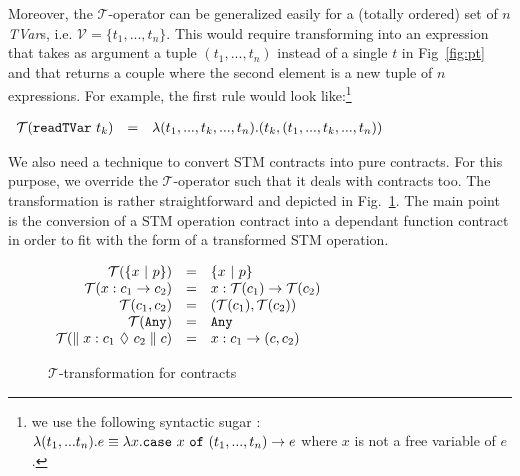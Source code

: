 \documentclass[submission,copyright,creativecommons]{eptcs}
\newcommand{\code}[1]{\textrm{{\tt #1}}}
\newcommand{\caseof}[2]{\code{case} \ #1 \ \code{of} \ #2 }
\newcommand{\readTVarONLY}{\ensuremath{\code{readTVar}}}
\newcommand{\readTVar}[1]{\ensuremath{\readTVarONLY \ #1}}
\newcommand{\pt}{\ensuremath{\mathcal{T}}}
\begin{document}
Moreover, the $\pt$-operator can be generalized easily for a (totally ordered) set of $n$ \emph{TVar}s, i.e. $\mathcal{V} = \{ t_1,...,t_n \}$. This would require transforming into an expression that takes as argument a tuple $(t_1,...,t_n)$ instead of a single $t$ in Fig~\ref{fig:pt} and that returns a couple where the second element is a new tuple of $n$ expressions. For example, the first rule would look like:\footnote{we use the following syntactic sugar : $ \lambda (t_1,...t_n) . e \equiv \lambda x . \caseof{x}{(t_1,...,t_n) -> e}$ where $x$ is not a free variable of $e$.}
\begin{center}
  \begin{math}
    \begin{array}{lll}
      \pt(\readTVar{t_k})     & = & \lambda (t_1,...,t_k,...,t_n) . (t_k,(t_1,...,t_k,...,t_n)) \\
    \end{array}
  \end{math}
\end{center}




We also need a technique to convert STM contracts into pure contracts. 
For this purpose, we override the $\pt$-operator such that it deals with contracts too. The transformation is rather straightforward and depicted in Fig.~\ref{fig:pt:contract}. The main point is the conversion of a STM operation contract into a dependant function contract in order to fit with the form of a transformed STM operation.

\begin{figure}[htb]
  \centering
\begin{math}
    \begin{array}{rll}
       \pt(\{ x \ | \ p \}) & = & \{ x \ | \ p\}\\
        \pt(x:c_1 \rightarrow c_2)  & = & x:\pt(c_1) \rightarrow \pt(c_2) \\
        \pt(c_1,c_2) & = & (\pt(c_1),\pt(c_2))    \\
        \pt(\code{Any}) &=& \code{Any}\\
        \pt(\contractTM{x : c_1}{c_2}{c}) &=& x : c_1 \rightarrow (c,c_2) \\ 
    \end{array}
  \end{math}\caption{$\pt$-transformation for contracts}
  \label{fig:pt:contract}
\end{figure}
\end{document}
